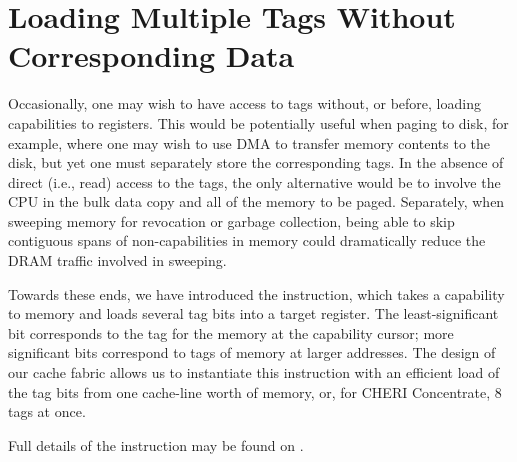
\section{Loading Multiple Tags Without Corresponding Data} %
\label{sec:rationale:cloadtags}

Occasionally, one may wish to have access to tags without, or before,
loading capabilities to registers.  This would be potentially useful when
paging to disk, for example, where one may wish to use DMA to transfer
memory contents to the disk, but yet one must separately store the
corresponding tags.  In the absence of direct (i.e., read) access to the
tags, the only alternative would be to involve the CPU in the bulk data copy
and  all of the memory to be paged.  Separately, when
sweeping memory for revocation or garbage collection, being able to skip
contiguous spans of non-capabilities in memory could dramatically reduce the
DRAM traffic involved in sweeping.

Towards these ends, we have introduced the 
instruction, which takes a capability to memory and loads several tag bits
into a target register.  The least-significant bit corresponds to the tag
for the memory at the capability cursor; more significant bits correspond to
tags of memory at larger addresses.  The design of our cache fabric allows
us to instantiate this instruction with an efficient load of the tag bits
from one cache-line worth of memory, or, for CHERI Concentrate, 8 tags at
once.

Full details of the  instruction may be found
on .

